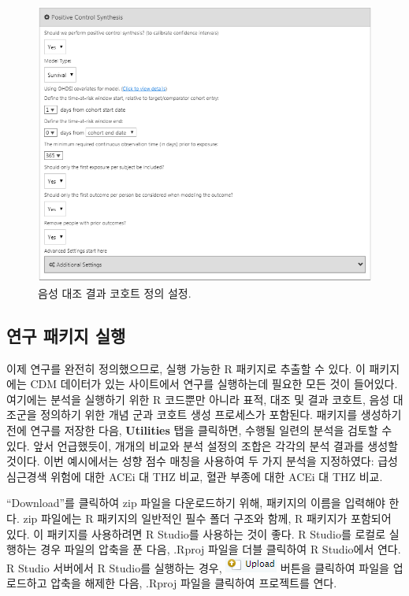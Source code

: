 \documentclass[10.5pt]{book}
\theoremstyle{definition}
\theoremstyle{definition}
\theoremstyle{definition}
\theoremstyle{remark}
\begin{document}
\begin{figure}

{\centering \includegraphics[width=1\linewidth]{images/PopulationLevelEstimation/pcSynthesis} 

}

\caption{음성 대조 결과 코호트 정의 설정.}\label{fig:pcSynthesis}
\end{figure}

\subsection{연구 패키지 실행}\label{--}

이제 연구를 완전히 정의했으므로, 실행 가능한 R 패키지로 추출할 수 있다.
이 패키지에는 CDM 데이터가 있는 사이트에서 연구를 실행하는데 필요한 모든
것이 들어있다. 여기에는 분석을 실행하기 위한 R 코드뿐만 아니라 표적,
대조 및 결과 코호트, 음성 대조군을 정의하기 위한 개념 군과 코호트 생성
프로세스가 포함된다. 패키지를 생성하기 전에 연구를 저장한 다음,
\textbf{Utilities} 탭을 클릭하면, 수행될 일련의 분석을 검토할 수 있다.
앞서 언급했듯이, 개개의 비교와 분석 설정의 조합은 각각의 분석 결과를
생성할 것이다. 이번 예시에서는 성향 점수 매칭을 사용하여 두 가지 분석을
지정하였다: 급성 심근경색 위험에 대한 ACEi 대 THZ 비교, 혈관 부종에 대한
ACEi 대 THZ 비교.

``Download''를 클릭하여 zip 파일을 다운로드하기 위해, 패키지의 이름을
입력해야 한다. zip 파일에는 R 패키지의 일반적인 필수 폴더 구조와 함께, R
패키지가 포함되어 있다. \citep{Wickham_2015} 이 패키지를 사용하려면 R
Studio를 사용하는 것이 좋다. R Studio를 로컬로 실행하는 경우 파일의
압축을 푼 다음, .Rproj 파일을 더블 클릭하여 R Studio에서 연다. R Studio
서버에서 R Studio를 실행하는 경우,
\includegraphics{images/PopulationLevelEstimation/upload.png} 버튼을
클릭하여 파일을 업로드하고 압축을 해제한 다음, .Rproj 파일을 클릭하여
프로젝트를 연다.
\end{document}
